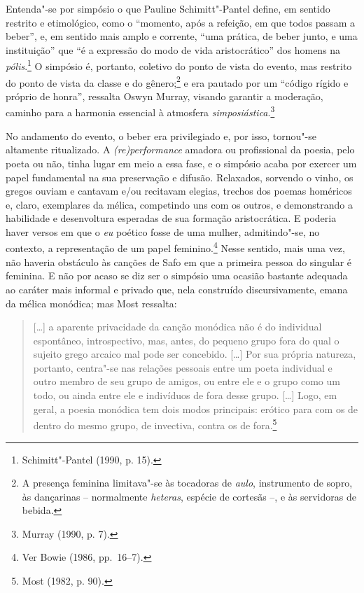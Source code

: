 Entenda"-se por simpósio o que Pauline Schimitt"-Pantel define, em
sentido restrito e etimológico, como o “momento, após a refeição, em que todos
passam a beber”, e, em sentido mais amplo e corrente, “uma prática, de beber
junto, e uma instituição” que “é a expressão do modo de vida aristocrático” dos
homens na \textit{pólis}.\footnote{ Schimitt"-Pantel (1990, p. 15).} O simpósio
é, portanto, coletivo do ponto de vista do
evento, mas restrito do ponto de vista da classe e do gênero;\footnote{A presença
feminina limitava"-se às tocadoras de \textit{aulo}, instrumento de sopro, às
dançarinas -- normalmente \textit{heteras}, espécie de cortesãs --, e às servidoras de bebida.} e era pautado por um
“código rígido e próprio de honra”, ressalta Oswyn Murray, visando
garantir a moderação, caminho para a harmonia essencial à atmosfera
\textit{simposiástica}.\footnote{ Murray (1990, p. 7).}

No andamento do evento, o beber era privilegiado e, por isso, tornou"-se
altamente ritualizado. A \textit{(re)performance} amadora ou profissional da
poesia, pelo poeta ou não, tinha lugar em meio a essa fase, e o simpósio acaba
por exercer um papel fundamental na sua preservação e difusão. Relaxados,
sorvendo o vinho, os gregos ouviam e cantavam e/ou recitavam elegias, trechos
dos poemas homéricos e, claro, exemplares da mélica, competindo uns com os
outros, e demonstrando a habilidade e desenvoltura esperadas de sua formação
aristocrática. E poderia haver
versos em que o \textit{eu} poético fosse de uma mulher, admitindo"-se, no contexto, a
representação de um papel feminino.\footnote{ Ver Bowie (1986, pp.~16--7).}
Nesse sentido, mais uma vez, não haveria obstáculo às canções de Safo em que a primeira pessoa do singular é feminina. E não por acaso se diz ser o simpósio uma
ocasião bastante adequada ao caráter mais informal e privado que, nela construído discursivamente, emana da mélica monódica; mas Most ressalta:

\begin{quote}
\mbox[\ldots{}] a aparente privacidade da canção monódica não é do individual espontâneo,
introspectivo, mas, antes, do pequeno grupo fora do qual o sujeito grego
arcaico mal pode ser concebido. [\ldots{}] Por sua própria natureza, portanto,
centra"-se nas relações pessoais entre um poeta individual e outro membro de seu
grupo de amigos, ou entre ele e o grupo como um todo, ou ainda entre ele e
indivíduos de fora desse grupo. [\ldots{}] Logo, em geral, a poesia monódica tem
dois modos principais: erótico para com os de dentro do mesmo grupo, de
invectiva, contra os de fora.\footnote{ Most (1982, p. 90).}
\end{quote}

